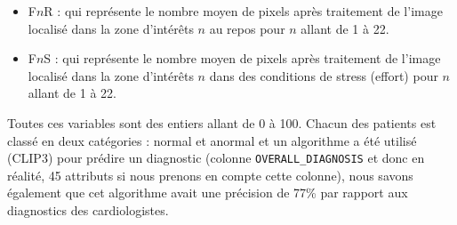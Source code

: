 \documentclass{NewTeX}
\begin{document}
    \begin{itemize}
        \item F$n$R : qui représente le nombre moyen de pixels après traitement de l'image localisé dans la zone d'intérêts $n$ au repos pour $n$ allant de 1 à 22.
        \item F$n$S : qui représente le nombre moyen de pixels après traitement de l'image localisé dans la zone d'intérêts $n$ dans des conditions de stress (effort) pour $n$ allant de 1 à 22.
    \end{itemize}

    Toutes ces variables sont des entiers allant de 0 à 100.
    Chacun des patients est classé en deux catégories : normal et anormal et un algorithme a été utilisé (CLIP3) pour prédire un diagnostic (colonne \verb|OVERALL_DIAGNOSIS| et donc en réalité, 45 attributs si nous prenons en compte cette colonne), nous savons également que cet algorithme avait une précision de 77\% par rapport aux diagnostics des cardiologistes.
\end{document}
